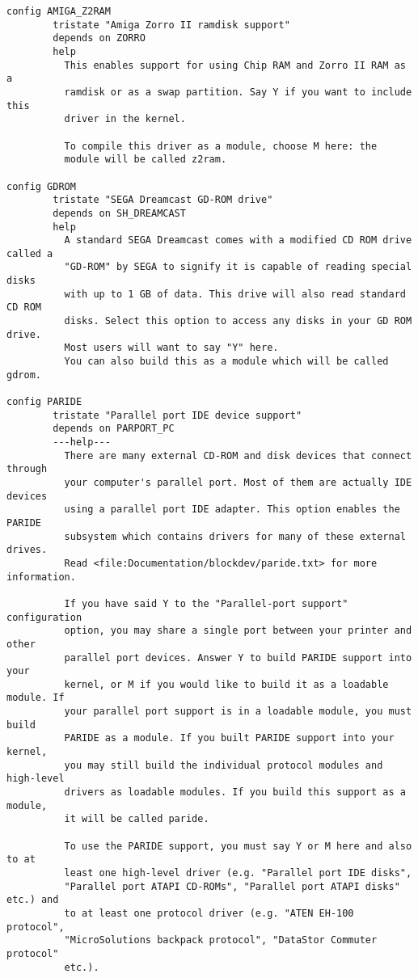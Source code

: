 \documentclass[journal,10pt,onecolumn,compsoc,letterpaper,draftclsnofoot,table,xcdraw]{IEEEtran} \usepackage[margin=0.75in]{geometry}
\begin{document}
\begin{verbatim}
config AMIGA_Z2RAM
        tristate "Amiga Zorro II ramdisk support"
        depends on ZORRO
        help
          This enables support for using Chip RAM and Zorro II RAM as a
          ramdisk or as a swap partition. Say Y if you want to include this
          driver in the kernel.

          To compile this driver as a module, choose M here: the
          module will be called z2ram.

config GDROM
        tristate "SEGA Dreamcast GD-ROM drive"
        depends on SH_DREAMCAST
        help
          A standard SEGA Dreamcast comes with a modified CD ROM drive called a
          "GD-ROM" by SEGA to signify it is capable of reading special disks
          with up to 1 GB of data. This drive will also read standard CD ROM
          disks. Select this option to access any disks in your GD ROM drive.
          Most users will want to say "Y" here.
          You can also build this as a module which will be called gdrom.

config PARIDE
        tristate "Parallel port IDE device support"
        depends on PARPORT_PC
        ---help---
          There are many external CD-ROM and disk devices that connect through
          your computer's parallel port. Most of them are actually IDE devices
          using a parallel port IDE adapter. This option enables the PARIDE
          subsystem which contains drivers for many of these external drives.
          Read <file:Documentation/blockdev/paride.txt> for more information.

          If you have said Y to the "Parallel-port support" configuration
          option, you may share a single port between your printer and other
          parallel port devices. Answer Y to build PARIDE support into your
          kernel, or M if you would like to build it as a loadable module. If
          your parallel port support is in a loadable module, you must build
          PARIDE as a module. If you built PARIDE support into your kernel,
          you may still build the individual protocol modules and high-level
          drivers as loadable modules. If you build this support as a module,
          it will be called paride.

          To use the PARIDE support, you must say Y or M here and also to at
          least one high-level driver (e.g. "Parallel port IDE disks",
          "Parallel port ATAPI CD-ROMs", "Parallel port ATAPI disks" etc.) and
          to at least one protocol driver (e.g. "ATEN EH-100 protocol",
          "MicroSolutions backpack protocol", "DataStor Commuter protocol"
          etc.).


\end{verbatim}
\end{document}
